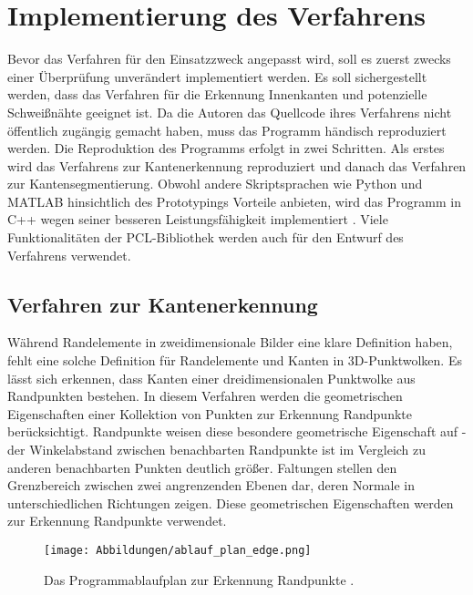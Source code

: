 \section{Implementierung des Verfahrens}
Bevor das Verfahren für den Einsatzzweck angepasst wird, soll es zuerst zwecks einer Überprüfung unverändert implementiert werden. Es soll sichergestellt werden, dass das Verfahren für die Erkennung Innenkanten und potenzielle Schweißnähte geeignet ist. Da die Autoren das Quellcode ihres Verfahrens nicht öffentlich zugängig gemacht haben, muss das Programm händisch reproduziert werden. Die Reproduktion des Programms erfolgt in zwei Schritten. Als erstes wird das Verfahrens zur Kantenerkennung reproduziert und danach das Verfahren zur Kantensegmentierung. Obwohl andere Skriptsprachen wie Python und MATLAB hinsichtlich des Prototypings Vorteile anbieten, wird das Programm in C++ wegen seiner besseren Leistungsfähigkeit implementiert \autocite{svensson_performance_2021}. Viele Funktionalitäten der PCL-Bibliothek \autocite{rusu_3d_2011} werden auch für den Entwurf des Verfahrens verwendet.

\subsection{Verfahren zur Kantenerkennung} \label{edge_detection_reprod}
Während Randelemente in zweidimensionale Bilder eine klare Definition haben, fehlt eine solche Definition für Randelemente und Kanten in 3D-Punktwolken. Es lässt sich erkennen, dass Kanten einer dreidimensionalen Punktwolke aus Randpunkten bestehen. In diesem Verfahren werden die geometrischen Eigenschaften einer Kollektion von Punkten zur Erkennung Randpunkte berücksichtigt. Randpunkte weisen diese besondere geometrische Eigenschaft auf - der Winkelabstand zwischen benachbarten Randpunkte ist im Vergleich zu anderen benachbarten Punkten deutlich größer. Faltungen stellen den Grenzbereich zwischen zwei angrenzenden Ebenen dar, deren Normale in unterschiedlichen Richtungen zeigen. Diese geometrischen Eigenschaften werden zur Erkennung Randpunkte verwendet. \autocite[1-2]{ni_edge_2016}

\begin{figure}[h]
	\texttt{[image: Abbildungen/ablauf\_plan\_edge.png]}
	\centering
	\caption{Das Programmablaufplan zur Erkennung Randpunkte \autocite{ni_edge_2016}.}
	\label{flow_chart}
\end{figure}

